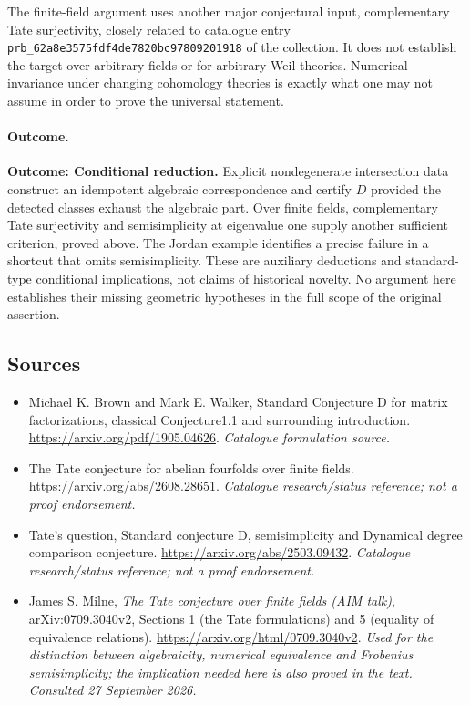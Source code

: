 \documentclass[11pt,a4paper]{article}
\numberwithin{equation}{section}
\begin{document}
The finite-field argument uses another major conjectural input,
complementary Tate surjectivity, closely related to catalogue entry \texttt{prb\_62a8e3575fdf4de7820bc97809201918} of the
collection. It does not establish the target over arbitrary fields or
for arbitrary Weil theories. Numerical invariance under changing
cohomology theories is exactly what one may not assume in order to
prove the universal statement.

\paragraph{Outcome.}
\textbf{Outcome: Conditional reduction.}
Explicit nondegenerate intersection data construct an idempotent algebraic
correspondence and certify $D$ provided the detected classes exhaust the
algebraic part. Over finite fields, complementary Tate surjectivity and
semisimplicity at eigenvalue one supply another sufficient criterion,
proved above. The Jordan example identifies a precise failure in a
shortcut that omits semisimplicity. These are auxiliary deductions and
standard-type conditional implications, not claims of historical novelty.
No argument here establishes their missing geometric hypotheses in the
full scope of the original assertion.
\subsection{Sources}
\begin{itemize}\raggedright
\item[\textnormal{[S1]}]\hypertarget{source:statement:1}{} Michael K. Brown and Mark E. Walker, Standard Conjecture D for matrix factorizations, classical Conjecture1.1 and surrounding introduction.
\url{https://arxiv.org/pdf/1905.04626}.
{\small\textit{Catalogue formulation source.}}
\item[\textnormal{[S2]}]\hypertarget{source:statement:2}{} The Tate conjecture for abelian fourfolds over finite fields.
\url{https://arxiv.org/abs/2608.28651}.
{\small\textit{Catalogue research/status reference; not a proof endorsement.}}
\item[\textnormal{[S3]}]\hypertarget{source:statement:3}{} Tate's question, Standard conjecture D, semisimplicity and Dynamical degree comparison conjecture.
\url{https://arxiv.org/abs/2503.09432}.
{\small\textit{Catalogue research/status reference; not a proof endorsement.}}
\item[\textnormal{[E1]}]\hypertarget{extra:statement:1}{} James S. Milne,
\emph{The Tate conjecture over finite fields (AIM talk)}, arXiv:0709.3040v2,
Sections 1 (the Tate formulations) and 5 (equality of equivalence relations).
\url{https://arxiv.org/html/0709.3040v2}.
{\small\textit{Used for the distinction between algebraicity, numerical equivalence and Frobenius semisimplicity; the implication needed here is also proved in the text. Consulted 27 September 2026.}}
\end{itemize}
\end{document}

